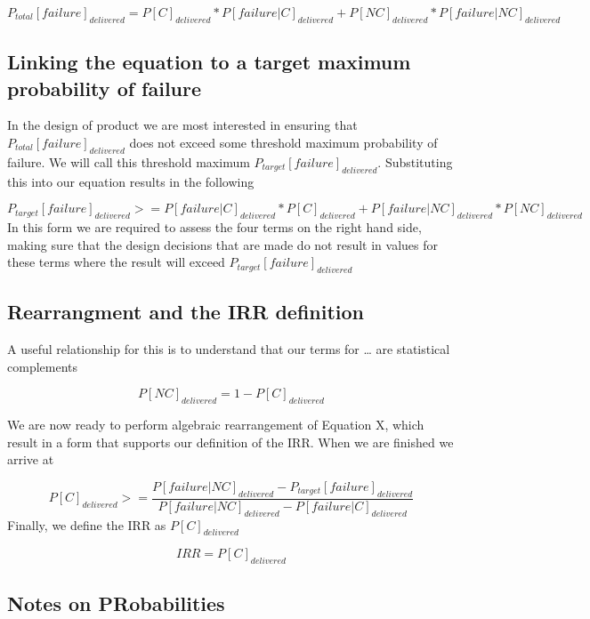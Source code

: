 \documentclass[
]{article}
\begin{document}
\[ P_{total}[failure]_{delivered} = P[C]_{delivered} * P[failure|C]_{delivered} + P[NC]_{delivered} * P[failure|NC]_{delivered} \tag{2}\]

\subsection{Linking the equation to a target maximum probability of failure}\label{linking-the-equation-to-a-target-maximum-probability-of-failure}

In the design of product we are most interested in ensuring that \(P_{total}[failure]_{delivered}\) does not exceed some threshold maximum probability of failure. We will call this threshold maximum \(P_{target}[failure]_{delivered}\). Substituting this into our equation results in the following

\[ P_{target}[failure]_{delivered} >= P[failure|C]_{delivered}*P[C]_{delivered} + P[failure|NC]_{delivered}*P[NC]_{delivered} \tag{3}\]
In this form we are required to assess the four terms on the right hand side, making sure that the design decisions that are made do not result in values for these terms where the result will exceed \(P_{target}[failure]_{delivered}\)

\subsection{Rearrangment and the IRR definition}\label{rearrangment-and-the-irr-definition}

A useful relationship for this is to understand that our terms for \ldots{} are statistical complements

\[ P[NC]_{delivered} = 1 -P[C]_{delivered} \]

We are now ready to perform algebraic rearrangement of Equation X, which result in a form that supports our definition of the IRR. When we are finished we arrive at

\[ P[C]_{delivered} >= \frac{P[failure|NC]_{delivered} - P_{target}[failure]_{delivered}}{P[failure|NC]_{delivered} -  P[failure|C]_{delivered}} \tag{4}\]
Finally, we define the IRR as \(P[C]_{delivered}\)

\[ IRR = P[C]_{delivered} \tag{5}\]

\subsection{Notes on PRobabilities}\label{notes-on-probabilities}
\end{document}
